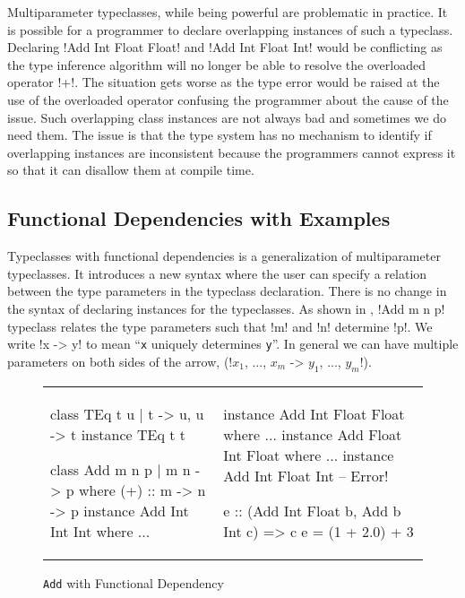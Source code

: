\documentclass[format=acmsmall,manuscript,review,screen,nonacm,margin=1in,11pt]{acmart}
\begin{document}
Multiparameter typeclasses, while being powerful are problematic in practice.
It is possible for a programmer to declare overlapping instances of such a typeclass.
Declaring !Add Int Float Float! and !Add Int Float Int!
would be conflicting as the type inference algorithm will no longer be able to resolve
the overloaded operator !+!. The situation gets worse as the type error would be raised
at the use of the overloaded operator confusing the programmer about the
cause of the issue. Such overlapping class instances are not always bad and sometimes
we do need them. The issue is that the type system has no mechanism to identify if overlapping instances
are inconsistent because the programmers cannot express it so that it can disallow them at compile time.

\subsection{Functional Dependencies with Examples}\label{subsec:fd}
Typeclasses with functional dependencies\cite{jones_tcfd_2000} is a generalization of multiparameter typeclasses.
It introduces a new syntax where the user can specify a relation between the type parameters
in the typeclass declaration. There is no change in the syntax of declaring instances for the typeclasses.
As shown in , !Add m n p! typeclass relates the type parameters such that
!m! and !n! determine !p!. We write !x -> y! to mean ``\texttt{x} uniquely determines \texttt{y}''.
In general we can have multiple parameters on both sides of the arrow,
(!$x_1$, ..., $x_m$ -> $y_1$, ..., $y_m$!).
\begin{figure}[h t]
  \footnotesize
  \begin{tabular}{l l}
    \begin{code}
      class TEq t u | t -> u, u -> t
      instance TEq t t
      
      class Add m n p | m n -> p where
        (+) :: m -> n -> p
      instance Add Int Int Int where
         ... 
    \end{code}&%
    \begin{code}
      instance Add Int Float Float where
         ...
      instance Add Float Int Float where
         ...
      instance Add Int Float Int -- Error!

      e :: (Add Int Float b, Add b Int c) => c
      e = (1 + 2.0) + 3
    \end{code}
  \end{tabular}
  \caption{\texttt{Add} with Functional Dependency}
  \label{fig:add-tc-fd}
\end{figure}
\end{document}
